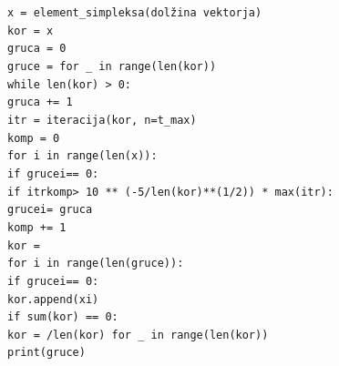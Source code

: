\documentclass[a4paper]{article}
\begin{document}
\texttt{x = element\_simpleksa(dolžina vektorja) }\\
\texttt{kor = x }\\
\texttt{gruca = 0 }\\
\texttt{gruce =  for \_ in range(len(kor))\rbrack }\\
\texttt{while len(kor) > 0: }\\
\hspace*{1cm}\texttt{gruca += 1 }\\
\hspace*{1cm}\texttt{itr = iteracija(kor, n=t\_max) }\\
\hspace*{1cm}\texttt{komp = 0 }\\
\hspace*{1cm}\texttt{for i in range(len(x)): }\\
\hspace*{2cm}\texttt{if gruce\lbrack i\rbrack  == 0: }\\
\hspace*{3cm}\texttt{if itr\rbrack \lbrack komp\rbrack  > 10 ** (-5/len(kor)**(1/2)) * max(itr\rbrack ): }\\
\hspace*{4cm}\texttt{gruce\lbrack i\rbrack  = gruca }\\
\hspace*{3cm}\texttt{komp += 1 }\\
\hspace*{1cm}\texttt{kor = \lbrack\rbrack  }\\
\hspace*{1cm}\texttt{for i in range(len(gruce)): }\\
\hspace*{2cm}\texttt{if gruce\lbrack i\rbrack  == 0: }\\
\hspace*{3cm}\texttt{kor.append(x\lbrack i\rbrack ) }\\
\hspace*{1cm}\texttt{if sum(kor) == 0: }\\
\hspace*{2cm}\texttt{kor = /len(kor) for \_ in range(len(kor))\rbrack  }\\
\texttt{print(gruce) }\newline \\
\end{document}
